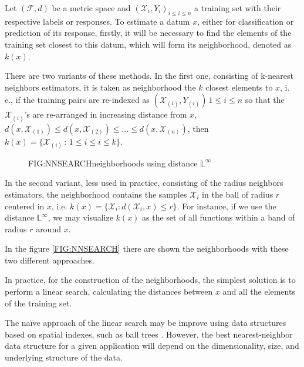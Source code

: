
Let $(\mathcal{F}, d)$ be a metric space and
$(\mathcal{X}_i, {Y}_i)_{i \le i \le n}$ a training set with their
respective labels or responses.
To estimate a datum $x$, either for classification or prediction of its
response, firstly, it will be necessary to find the elements of the training set
closest to this datum, which will form its neighborhood, denoted as $k(x)$.

There are two variants of these methods. In the first one, consisting of
k-nearest neighbors estimators, it is taken as neighborhood the $k$ closest
elements to $x$, i. e., if the training pairs are re-indexed as
$(\mathcal{X}_{(i)}, Y_{(i)}) \, 1\le i\le n$ so that the
$\mathcal{X}_{(i)}$'s are re-arranged in increasing distance from $x$,
$d(x, \mathcal{X}_{(1)}) \le d(x, \mathcal{X}_{(2)}) \le \dots \le d(x, \mathcal{X}_{(n)})$,
 then $k(x) = \{\mathcal{X}_{(i)} \, : \, 1 \le i \le i\le k\}$.

\begin{figure}[Neighborhoods using distance $\mathbb{L}^\infty$]{FIG:NNSEARCH}{neighborhoods using distance $\mathbb{L}^\infty$}
	 \quad
\end{figure}

In the second variant, less used in practice, consisting of the radius neighbors
estimators, the neighborhood contains the samples $\mathcal{X}_i$ in the ball of
radius $r$ centered in $x$, i.e.
$k(x) = \{ \mathcal{X}_i : d(\mathcal{X}_i , x) \le r\}$. For instance, if we
use the distance $\mathbb{L}^\infty$, we may visualize $k(x)$ as the set of all
functions within a band  of radius $r$ around $x$.

In the figure \ref{FIG:NNSEARCH} there are shown the neighborhoods with these two different
approaches.

In practice, for the construction of the neighborhoods, the simplest solution is
 to perform a linear search, calculating the distances between $x$ and all the
 elements of the training set.

The naïve approach of the linear search may be improve using data structures
based on spatial indexes, such as ball trees \cite{Kumar2008}. However, the best
nearest-neighbor data structure for a given application will depend on the
dimensionality, size, and underlying structure of the data.
